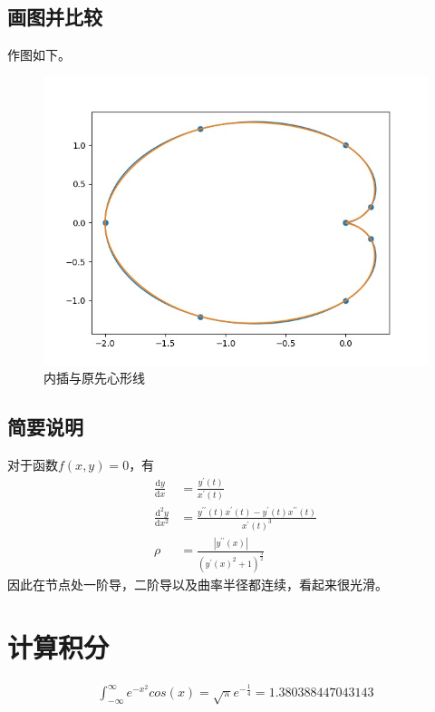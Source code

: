 \documentclass{article}
\numberwithin{equation}{section}
\numberwithin{table}{section}
\begin{document}
\subsection{画图并比较}
作图如下。
\begin{figure}[H]
    \centering
    \includegraphics[scale=0.5]{cardioid.jpg}
    \caption{内插与原先心形线}
\end{figure}
\subsection{简要说明}
对于函数$f\left(x,y\right)=0$，有
\begin{align}
    \frac{\mathrm{d}y}{\mathrm{d}x}     & =\frac{y^\prime\left(t\right)}{x^\prime\left(t\right)}                                                                                      \\
    \frac{\mathrm{d}^2y}{\mathrm{d}x^2} & =\frac{y^{\prime\prime}\left(t\right)x^\prime\left(t\right)-y^\prime\left(t\right)x^{\prime\prime}\left(t\right)}{x^\prime\left(t\right)^3} \\
    \rho                                & =\frac{\left|y^{\prime\prime}\left(x\right)\right|}{\left(y^\prime\left(x\right)^2+1\right)^{\frac{3}{2}}}
\end{align}
因此在节点处一阶导，二阶导以及曲率半径都连续，看起来很光滑。
\section{计算积分}
\begin{align}
    \int_{-\infty}^\infty e^{-x^2}cos\left(x\right)=\sqrt{\pi}e^{-\frac{1}{4}}=1.380388447043143
\end{align}
\end{document}
